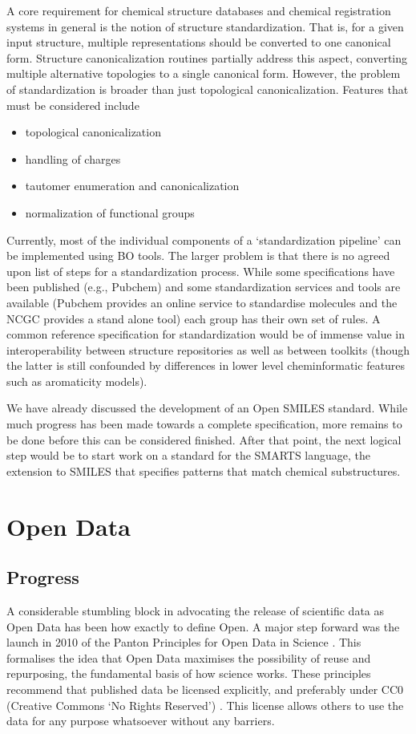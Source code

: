 \documentclass[10pt]{bmc_article}
\newenvironment{bmcformat}{\begin{raggedright}\baselineskip20pt\sloppy\setboolean{publ}{false}}{\end{raggedright}\baselineskip20pt\sloppy}
\begin{document}
\begin{bmcformat}
A core requirement for chemical structure databases and chemical
registration systems in general is the notion of structure
standardization.  That is,  for a given input structure, multiple
representations should be converted to one canonical form. 
Structure canonicalization routines partially address this aspect,
converting multiple alternative topologies to a single canonical
form. However, the problem of standardization is broader than just
topological canonicalization. Features that must be considered include
\begin{itemize}
\item topological canonicalization
\item handling of charges
\item tautomer enumeration and canonicalization
\item normalization of functional groups
\end{itemize}
Currently, most of the individual components of a `standardization
pipeline' can be implemented using BO tools. The larger problem is
that there is no agreed upon list of steps for a standardization
process. While some specifications have been published (e.g., Pubchem)
and some standardization services and tools are available (Pubchem
provides an online service to standardise molecules and the NCGC
provides a stand alone tool) each group has their own set of rules. A
common reference specification for standardization would be of immense
value in interoperability between structure repositories as well as
between toolkits (though the latter is still confounded by differences
in lower level cheminformatic features such as aromaticity models).

We have already discussed the development of an Open SMILES standard. While much progress has been made towards a complete specification, more remains to be done before this can be considered finished. After that point, the next logical step would be to start work on a standard for the SMARTS language, the extension to SMILES that specifies patterns that match chemical substructures.

\section*{Open Data}
  \subsection*{Progress}

A considerable stumbling block in advocating the release of scientific
data as Open Data has been how exactly to define Open. A major step
forward was the launch in 2010 of the Panton Principles for Open Data
in Science \cite{WebPanton}. This formalises the idea that Open Data maximises the
possibility of reuse and repurposing, the fundamental basis
of how science works. These principles recommend that published data
be licensed explicitly, and preferably under CC0 (Creative Commons `No
Rights Reserved') \cite{WebCC0}. This license allows others to use the data for any
purpose whatsoever without any barriers.


\end{bmcformat}
\end{document}
